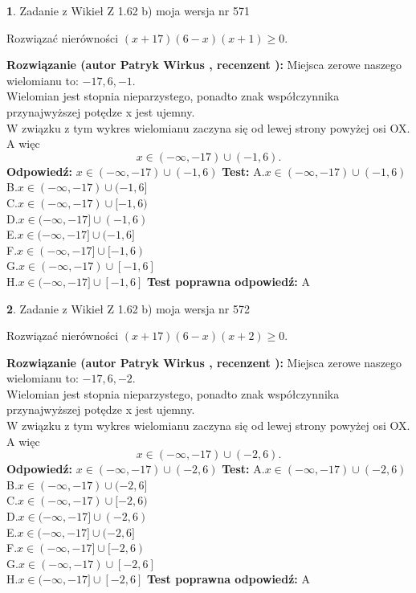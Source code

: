 \documentclass[12pt, a4paper]{article}
\theoremstyle{definition} %
\newtheorem{zad}{}
\newcommand{\zadStart}[1]{\begin{zad}#1\newline}
\newcommand{\zadStop}{\end{zad}}
\newcommand{\rozwStart}[2]{\noindent \textbf{Rozwiązanie (autor #1 , recenzent #2): }\newline}
\newcommand{\rozwStop}{\newline}
\newcommand{\odpStart}{\noindent \textbf{Odpowiedź:}\newline}
\newcommand{\odpStop}{\newline}
\newcommand{\testStart}{\noindent \textbf{Test:}\newline}
\newcommand{\testStop}{\newline}
\newcommand{\kluczStart}{\noindent \textbf{Test poprawna odpowiedź:}\newline}
\newcommand{\kluczStop}{\newline}
\begin{document}
\zadStart{Zadanie z Wikieł Z 1.62 b) moja wersja nr 571}

Rozwiązać nierówności $(x+17)(6-x)(x+1)\ge0$.
\zadStop
\rozwStart{Patryk Wirkus}{}
Miejsca zerowe naszego wielomianu to: $-17, 6, -1$.\\
Wielomian jest stopnia nieparzystego, ponadto znak współczynnika przy\linebreak najwyższej potędze x jest ujemny.\\ W związku z tym wykres wielomianu zaczyna się od lewej strony powyżej osi OX. A więc $$x \in (-\infty,-17) \cup (-1,6).$$
\rozwStop
\odpStart
$x \in (-\infty,-17) \cup (-1,6)$
\odpStop
\testStart
A.$x \in (-\infty,-17) \cup (-1,6)$\\
B.$x \in (-\infty,-17) \cup (-1,6]$\\
C.$x \in (-\infty,-17) \cup [-1,6)$\\
D.$x \in (-\infty,-17] \cup (-1,6)$\\
E.$x \in (-\infty,-17] \cup (-1,6]$\\
F.$x \in (-\infty,-17] \cup [-1,6)$\\
G.$x \in (-\infty,-17) \cup [-1,6]$\\
H.$x \in (-\infty,-17] \cup [-1,6]$
\testStop
\kluczStart
A
\kluczStop



\zadStart{Zadanie z Wikieł Z 1.62 b) moja wersja nr 572}

Rozwiązać nierówności $(x+17)(6-x)(x+2)\ge0$.
\zadStop
\rozwStart{Patryk Wirkus}{}
Miejsca zerowe naszego wielomianu to: $-17, 6, -2$.\\
Wielomian jest stopnia nieparzystego, ponadto znak współczynnika przy\linebreak najwyższej potędze x jest ujemny.\\ W związku z tym wykres wielomianu zaczyna się od lewej strony powyżej osi OX. A więc $$x \in (-\infty,-17) \cup (-2,6).$$
\rozwStop
\odpStart
$x \in (-\infty,-17) \cup (-2,6)$
\odpStop
\testStart
A.$x \in (-\infty,-17) \cup (-2,6)$\\
B.$x \in (-\infty,-17) \cup (-2,6]$\\
C.$x \in (-\infty,-17) \cup [-2,6)$\\
D.$x \in (-\infty,-17] \cup (-2,6)$\\
E.$x \in (-\infty,-17] \cup (-2,6]$\\
F.$x \in (-\infty,-17] \cup [-2,6)$\\
G.$x \in (-\infty,-17) \cup [-2,6]$\\
H.$x \in (-\infty,-17] \cup [-2,6]$
\testStop
\kluczStart
A
\kluczStop
\end{document}
